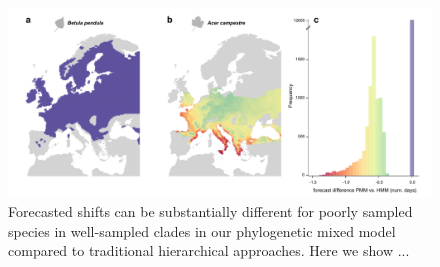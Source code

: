 \documentclass[11pt]{article}
\begin{document}
\begin{figure} [H]
  \begin{center}
  \includegraphics[width=16cm]{../../analyses/phylogeny/figures/Fig4_forecasting_diffstdpmm-lmm.pdf}
  \caption{Forecasted shifts can be substantially different for poorly sampled species in well-sampled clades in our phylogenetic mixed model compared to traditional hierarchical approaches. Here we show ...}
  \label{fig:forecast}
  \end{center}
\end{figure}

\clearpage
\end{document}
